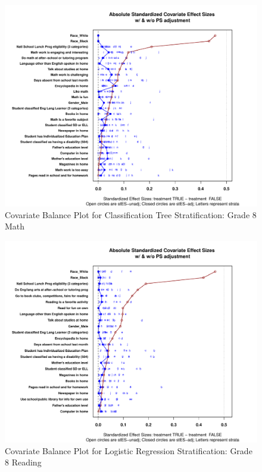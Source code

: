 \documentclass[letterpaper,12p,twoside]{article} %
\begin{document}
\begin{figure}
\begin{center}
\includegraphics[width=\textwidth]{../Figures2009/g8math-tree-balance.pdf}
\caption{Covariate Balance Plot for Classification Tree Stratification: Grade 8 Math}
\end{center}
\end{figure}

\begin{figure}[h!]
\begin{center}
\includegraphics[width=\textwidth]{../Figures2009/g8read-lr-balance.pdf}
\caption{Covariate Balance Plot for Logistic Regression Stratification: Grade 8 Reading}
\end{center}
\end{figure}
\end{document}
